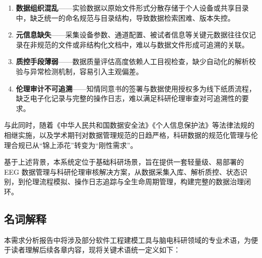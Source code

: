 \begin{enumerate}
  \item \textbf{数据组织混乱}——实验数据以原始文件形式分散存储于个人设备或共享目录中，缺乏统一的命名规范与目录结构，导致数据检索困难、版本失控。
  \item \textbf{元信息缺失}——采集设备参数、通道配置、被试者信息等关键元数据往往仅记录在非规范的文件或非结构化文档中，难以与数据文件形成可追溯的关联。
  \item \textbf{质控手段薄弱}——数据质量评估高度依赖人工目视检查，缺少自动化的解析校验与异常检测机制，容易引入主观偏差。
  \item \textbf{伦理审计不可追溯}——知情同意书的签署与数据使用授权多为线下纸质流程，缺乏电子化记录与完整的操作日志，难以满足科研伦理审查对可追溯性的要求。
\end{enumerate}

与此同时，随着《中华人民共和国数据安全法》《个人信息保护法》等法律法规的相继实施，以及学术期刊对数据管理规范的日趋严格，科研数据的规范化管理与伦理合规已从``锦上添花''转变为``刚性需求''。

基于上述背景，本系统定位于基础科研场景，旨在提供一套轻量级、易部署的 EEG 数据管理与科研伦理审核解决方案，从数据采集入库、解析质控、状态识别，到伦理流程模拟、操作日志追踪与全生命周期管理，构建完整的数据治理闭环。

\subsection{名词解释}

本需求分析报告中将涉及部分软件工程建模工具与脑电科研领域的专业术语，为便于读者理解后续各章内容，现将关键术语统一定义如下：

